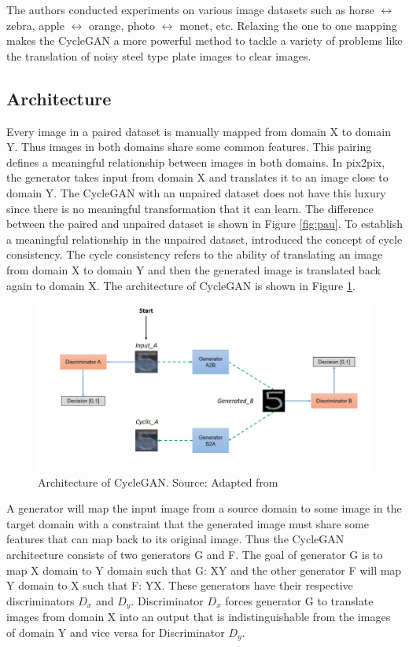	The authors conducted experiments on various image datasets such as horse $\leftrightarrow$ zebra, apple $\leftrightarrow$ orange, photo $\leftrightarrow$ monet, etc. Relaxing the one to one mapping makes the CycleGAN a more powerful method to tackle a variety of problems like the translation of noisy steel type plate images to clear images.

\subsection{Architecture}

Every image in a paired dataset is manually mapped from domain X to domain Y. Thus images in both domains share some common features. This pairing defines a meaningful relationship between images in both domains. In pix2pix, the generator takes input from domain X and translates it to an image close to domain Y. The CycleGAN with an unpaired dataset does not have this luxury since there is no meaningful transformation that it can learn.
The difference between the paired and unpaired dataset is shown in Figure \ref{fig:pau}. To establish a meaningful relationship in the unpaired dataset, \citeauthor{CycleGAN2017} introduced the concept of cycle consistency. The cycle consistency refers to the ability of translating an image from domain X to domain Y and then the generated image is translated back again to domain X. The architecture of CycleGAN is shown in Figure \ref{fig:cycarch}.

\begin{figure}[H]
\centering
\includegraphics[width=5in]{images/cycGANarch.PNG}
\caption[Architecture of CycleGAN]{Architecture of CycleGAN. Source: Adapted from \citep{CycleGAN2017}}
\label{fig:cycarch}
\end{figure}

A generator will map the input image from a source domain to some image in the target domain with a constraint that the generated image must share some features that can map back to its original image. Thus the CycleGAN architecture consists of two generators G and F. The goal of generator G is to map X domain to Y domain such that G: X\textrightarrow Y and the other generator F will map Y domain to X such that F: Y\textrightarrow X. These generators have their respective discriminators $D_x$ and $D_y$. Discriminator $D_x$ forces generator G to translate images from domain X into an output that is indistinguishable from the images of domain Y and vice versa for Discriminator $D_y$.

